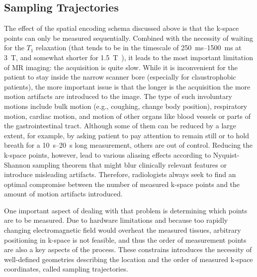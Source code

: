 \subsection{Sampling Trajectories}
The effect of the spatial encoding schema discussed above is that the k-space points can only be measured sequentially. Combined with the necessity of waiting for the $T_1$ relaxation (that tends to be in the timescale of  \SIrange{250}{1500}{\milli\second} at \SI{3}{T}, and somewhat shorter for \SI{1.5}{T}~\cite{gold_musculoskeletal_2004,bojorquez_what_2017,stanisz_t1_nodate}), it leads to the most important limitation of MR imaging: the acquisition is quite slow. While it is inconvenient for the patient to stay inside the narrow scanner bore (especially for claustrophobic patients), the more important issue is that the longer is the acquisition the more motion artifacts are introduced to the image. The type of such involuntary motions include bulk motion (e.g., coughing, change body position), respiratory motion, cardiac motion, and motion of other organs like blood vessels or parts of the gastrointestinal tract. Although some of them can be reduced by a large extent, for example, by asking patient to pay attention to remain still or to hold breath for a \SIrange{10}{20}{\second} long measurement, others are out of control. Reducing the k-space points, however, lead to various aliasing effects according to Nyquist-Shannon sampling theorem that might blur clinically relevant features or introduce misleading artifacts. Therefore, radiologists always seek to find an optimal compromise between the number of measured k-space points and the amount of motion artifacts introduced.

One important aspect of dealing with that problem is determining which points are to be measured. Due to hardware limitations and because too rapidly changing electromagnetic field would overheat the measured tissues, arbitrary positioning in k-space is not feasible, and thus the order of measurement points are also a key aspects of the process. These constrains introduces the necessity of well-defined geometries describing the location and the order of measured k-space coordinates, called sampling trajectories.

